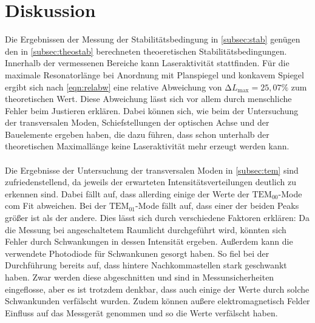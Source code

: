 \section{Diskussion}
\label{sec:Diskussion}
Die Ergebnissen der Messung der Stabilitätsbedingung in \autoref{subsec:stab} genügen den in \autoref{subsec:theostab} berechneten theoeretischen Stabilitätsbedingungen.
Innerhalb der vermessenen Bereiche kann Laseraktivität stattfinden. 
Für die maximale Resonatorlänge bei Anordnung mit Planspiegel und konkavem Spiegel ergibt sich nach \autoref{eqn:relabw} eine relative Abweichung von $\increment L_{\mathrm{max}}=25,07 \%$ zum theoretischen Wert.
Diese Abweichung lässt sich vor allem durch menschliche Fehler beim Justieren erklären. %
Dabei können sich, wie beim der Untersuchung der transversalen Moden, Schiefstellungen der optischen Achse und der Bauelemente ergeben haben, die dazu führen, 
dass schon unterhalb der theoretischen Maximallänge keine Laseraktivität mehr erzeugt werden kann. 
\\\\
Die Ergebnisse der Untersuchung der transversalen Moden in \autoref{subsec:tem} sind zufriedenstellend, da jeweils der erwarteten Intensitätsverteilungen deutlich zu erkennen sind.
Dabei fällt auf, dass allerding einige der Werte der $\mathrm{TEM}_{00}$-Mode com Fit abweichen. 
Bei der $\mathrm{TEM}_{01}$-Mode fällt auf, dass einer der beiden Peaks größer ist als der andere. 
Dies lässt sich durch verschiedene Faktoren erklären:
Da die Messung bei angeschaltetem Raumlicht durchgeführt wird, könnten sich Fehler durch Schwankungen in dessen Intensität ergeben. 
Außerdem kann die verwendete Photodiode für Schwankunen gesorgt haben.
So fiel bei der Durchführung bereits auf, dass hintere Nachkommastellen stark geschwankt haben.
Zwar werden diese abgeschnitten und sind in Messunsicherheiten eingeflosse, aber es ist trotzdem denkbar, dass auch einige der Werte durch solche Schwankunden verfälscht wurden. 
Zudem können außere elektromagnetisch Felder Einfluss auf das Messgerät genommen und so die Werte verfälscht haben. 
